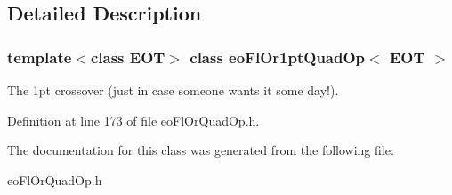 \subsection{Detailed Description}
\subsubsection*{template$<$class EOT$>$ class eo\-Fl\-Or1pt\-Quad\-Op$<$ EOT $>$}

The 1pt crossover (just in case someone wants it some day!). 



Definition at line 173 of file eo\-Fl\-Or\-Quad\-Op.h.

The documentation for this class was generated from the following file:\begin{CompactItemize}
\item 
eo\-Fl\-Or\-Quad\-Op.h\end{CompactItemize}
